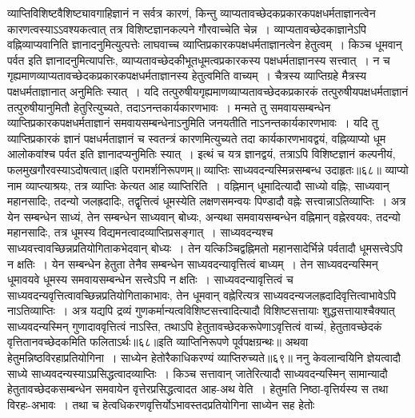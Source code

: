 व्याप्तिविशिष्टवैशिष्ट्यावगाहिज्ञानं न सर्वत्र कारणं, किन्तु व्याप्यतावच्छेदकप्रकारकपक्षधर्मताज्ञानत्वेन कारणत्वस्याऽऽवश्यकत्वात् तत्र विशिष्टज्ञानकल्पने गौरवाच्चेति
चेन्न~। व्याप्यतावच्छेदकाज्ञानेऽपि वह्निव्याप्यवानिति ज्ञानादनुमित्युत्पत्तेः लाघवाच्च व्याप्तिप्रकारकपक्षधर्मताज्ञानत्वेन हेतुत्वम्~।
किञ्च धूमवान् पर्वत इति ज्ञानादनुमित्यापत्तिः, व्याप्यतावच्छेदकीभूतधूमत्वप्रकारकस्य पक्षधर्मताज्ञानस्य सत्त्वात्~।
न च गृह्यमाणव्याप्यतावच्छेदकप्रकारकपक्षधर्मताज्ञानस्य हेतुत्वमिति वाच्यम्~। चैत्रस्य व्याप्तिग्रहे मैत्रस्य पक्षधर्मताज्ञानात् अनुमितिः स्यात्~।
यदि तत्पुरुषीयगृह्यमाणव्याप्यतावच्छेदकप्रकारकं तत्पुरुषीयपक्षधर्मताज्ञानं तत्पुरुषीयानुमितौ हेतुरित्युच्यते, तदाऽनन्तकार्यकारणभावः~। मन्मते तु समवायसम्बन्धेन
व्याप्तिप्रकारकपक्षधर्मताज्ञानं समवायसम्बन्धेनाऽनुमिति जनयतीति नाऽनन्तकार्यकारणभावः~।
यदि तु व्याप्तिप्रकारकं ज्ञानं पक्षधर्मताज्ञानं च स्वतन्त्रं कारणमित्युच्यते तदा कार्यकारणभावद्वयं, वह्निव्याप्यो धूम आलोकवांश्च पर्वत इति ज्ञानादप्यनुमितिः
स्यात्~। इत्थं च यत्र ज्ञानद्वयं, तत्राऽपि विशिष्टज्ञानं कल्पनीयं, फलमुखगौरवस्याऽदोषत्वात्॥इति परामर्शनिरूपणम्॥
व्याप्तिः साध्यवदन्यस्मिन्नसम्बन्ध उदाहृतः॥६८॥
व्याप्यो नाम व्याप्त्याश्रयः, तत्र व्याप्तिः केत्यत आह व्याप्तिरिति~। वह्निमान् धूमादित्यादौ साध्यो वह्निः, साध्यवान् महानसादिः, तदन्यो जलह्रदादिः, तद्वृृत्तित्वं
धूमस्येति लक्षणसमन्वयः पिण्डादौ वह्नेः सत्त्वान्नाऽतिव्याप्तिः~।
अत्र येन सम्बन्धेन साध्यं, तेन सम्बन्धेन साध्यवान् बोध्यः, अन्यथा समवायसम्बन्धेन वह्निमान् वह्नेरवयवः, तदन्यो महानसादिः, तत्र धूमस्य
विद्यमनत्वादव्याप्तिप्रसङ्गात्~।
साध्यवदन्यश्च साध्यवत्त्वावच्छिन्नप्रतियोगिताकभेदवान् बोध्यः~। तेन यत्किञ्चिद्वह्निमतो महानसादेर्भिन्ने पर्वतादौ धूमसत्त्वेऽपि न क्षतिः~।
येन सम्बन्धेन हेतुता तेनैव सम्बन्धेन साध्यवदन्यावृत्तित्वं बाध्यम्~। तेन साध्यवदन्यस्मिन् धूमावयवे धूमस्य समवायसम्बन्धेन सत्त्वेऽपि न क्षतिः~।
साध्यवदन्यावृत्तित्वं च साध्यवदन्यवृत्तित्वावच्छिन्नप्रतियोगिताकाभावः, तेन धूमवान् वह्नेरित्यत्र साध्यवदन्यजलह्रदादिवृत्तित्वाभावेऽपि नाऽतिव्याप्तिः~।
अत्र यद्यपि द्रव्यं गुणकर्मान्यत्वविशिष्टसत्त्वादित्यादौ विशिष्टसत्तायाः शुद्धसत्तायाश्चैक्यात् साध्यवदन्यस्मिन् गुणादाववृत्तित्वं नाऽस्ति, तथाऽपि
हेतुतावच्छेदकरूपेणाऽवृत्तित्वं वाच्यं, हेतुतावच्छेदकं वृत्तितानवच्छेदकमिति फलिताऽर्थः॥६८॥इति व्याप्तिनिरूपणे पूर्वपक्षग्रन्थः॥
अथवा हेतुमन्निष्ठविरहाप्रतियोगिना~।
साध्येन हेतोरैकाधिकरण्यं व्याप्तिरुच्यते॥६९॥
ननु केवलान्वयिनि ज्ञेयत्वादौ साध्ये साध्यवदन्यस्याऽप्रसिद्धत्वादव्याप्तिः~। किञ्च सत्तावान् जातेरित्यादौ साध्यवदन्यस्मिन् सामान्यादौ हेतुतावच्छेदकसम्बन्धेन
समवायेन वृत्तेरप्रसिद्धत्वादत आह-अथ वेति~। हेतुमति निष्ठा-वृत्तिर्यस्य स तथा विरहः-अभावः~। तथा च हेत्वधिकरणवृत्तिर्योऽभावस्तदप्रतियोगिना साध्येन सह हेतोः
